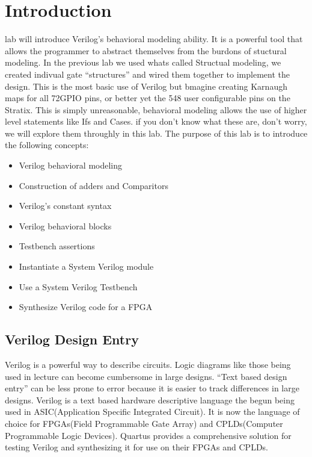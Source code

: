 \documentclass[12pt,journal]{IEEEtran}
\begin{document}




  \section{\bfseries Introduction}
     lab will introduce Verilog's behavioral modeling ability. It is a powerful tool that allows the programmer to abstract themselves from the burdons of stuctural modeling. In the previous lab we used whats called Structual modeling, we created indivual gate ``structures'' and wired them together to implement the design. This is the most basic use of Verilog but bmagine creating Karnaugh maps for all 72GPIO pins, or better yet the 548 user configurable pins on the Stratix\cite{Altera:StratixDeviceOverview}. This is simply unreasonable, behavioral modeling allows the use of higher level statements like Ifs and Cases. if you don't know what these are, don't worry, we will explore them throughly in this lab. The purpose of this lab is to introduce the following concepts:
    \begin{itemize}
      \item Verilog behavioral modeling
      \item Construction of adders and Comparitors
      \item Verilog's constant syntax
      \item Verilog behavioral blocks
      \item Testbench assertions
      \item Instantiate a System Verilog module
      \item Use a System Verilog Testbench
      \item Synthesize Verilog code for a FPGA
    \end{itemize}
    
    \subsection{Verilog Design Entry}
      Verilog is a powerful way to describe circuits. Logic diagrams like those being used in lecture can become cumbersome in large designs. ``Text based design entry'' can be less prone to error because it is easier to track differences in large designs. Verilog is a text based hardware descriptive language the begun being used in ASIC(Application Specific Integrated Circuit). It is now the language of choice for FPGAs(Field Programmable Gate Array) and CPLDs(Computer Programmable Logic Devices). Quartus provides a comprehensive solution for testing Verilog and synthesizing it for use on their FPGAs and CPLDs.
\end{document}
